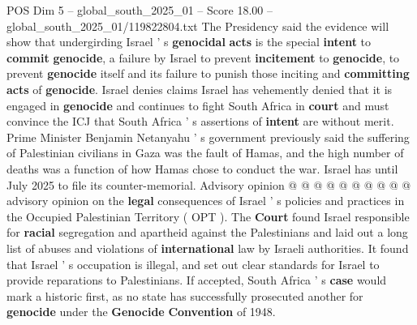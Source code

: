 \begin{textsample}{POS Dim 5 – global\_south\_2025\_01 – Score 18.00 – global\_south\_2025\_01/119822804.txt}
The Presidency said the evidence will show that undergirding Israel ' s \textbf{genocidal} \textbf{acts} is the special \textbf{intent} to \textbf{commit} \textbf{genocide}, a failure by Israel to prevent \textbf{incitement} to \textbf{genocide}, to prevent \textbf{genocide} itself and its failure to punish those inciting and \textbf{committing} \textbf{acts} of \textbf{genocide}.
Israel denies claims Israel has vehemently denied that it is engaged in \textbf{genocide} and continues to fight South Africa in \textbf{court} and must convince the ICJ that South Africa ' s assertions of \textbf{intent} are without merit.
Prime Minister Benjamin Netanyahu ' s government previously said the suffering of Palestinian civilians in Gaza was the fault of Hamas, and the high number of deaths was a function of how Hamas chose to conduct the war.
Israel has until July 2025 to file its counter-memorial.
Advisory opinion @ @ @ @ @ @ @ @ @ @ advisory opinion on the \textbf{legal} consequences of Israel ' s policies and practices in the Occupied Palestinian Territory ( OPT ).
The \textbf{Court} found Israel responsible for \textbf{racial} segregation and apartheid against the Palestinians and laid out a long list of abuses and violations of \textbf{international} law by Israeli authorities.
It found that Israel ' s occupation is illegal, and set out clear standards for Israel to provide reparations to Palestinians.
If accepted, South Africa ' s \textbf{case} would mark a historic first, as no state has successfully prosecuted another for \textbf{genocide} under the \textbf{Genocide} \textbf{Convention} of 1948.

\end{textsample}
